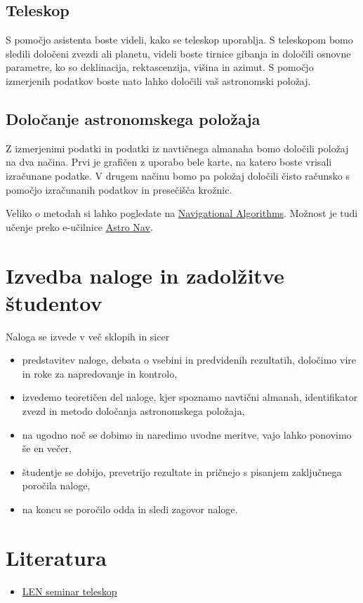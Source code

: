 \documentclass[11pt,a4]{article}
\begin{document}
\subsection{Teleskop}
S pomočjo asistenta boste videli, kako se teleskop uporablja. S teleskopom bomo sledili določeni zvezdi ali planetu, videli boste tirnice gibanja in določili osnovne parametre, ko so deklinacija, rektascenzija, višina in azimut. S pomočjo izmerjenih podatkov boste nato lahko določili vaš astronomski položaj.

\subsection{Določanje astronomskega položaja}
Z izmerjenimi podatki in podatki iz navtičnega almanaha bomo določili položaj na dva načina. Prvi je grafičen z uporabo bele karte, na katero boste vrisali izračunane podatke. V drugem načinu bomo pa položaj določili čisto računsko s pomočjo izračunanih podatkov in presečišča krožnic. 

Veliko o metodah si lahko pogledate na \href{https://sites.google.com/site/navigationalalgorithms}{Navigational Algorithms}. Možnost je tudi učenje preko e-učilnice \href{https://my.vanderbilt.edu/astronav}{Astro Nav}.

\section{Izvedba naloge in zadolžitve študentov}
Naloga se izvede v več sklopih in sicer

\begin{itemize}
	\item predstavitev naloge, debata o vsebini in predvidenih rezultatih, določimo vire in roke za napredovanje in kontrolo,
	\item izvedemo teoretičen del naloge, kjer spoznamo navtični almanah, identifikator zvezd in metodo določanja astronomskega položaja,
	\item na ugodno noč se dobimo in naredimo uvodne meritve, vajo lahko ponovimo še en večer,
	\item študentje se dobijo, prevetrijo rezultate in pričnejo s pisanjem zaključnega poročila naloge,
	\item na koncu se poročilo odda in sledi zagovor naloge.  
\end{itemize}

\section*{Literatura}
\begin{itemize}
	\item \href{https://drive.google.com/open?id=0B1dT-CBA07ANZGNEUlc1MEtlZXM}{LEN seminar teleskop}
\end{itemize}

%
%
\end{document}
